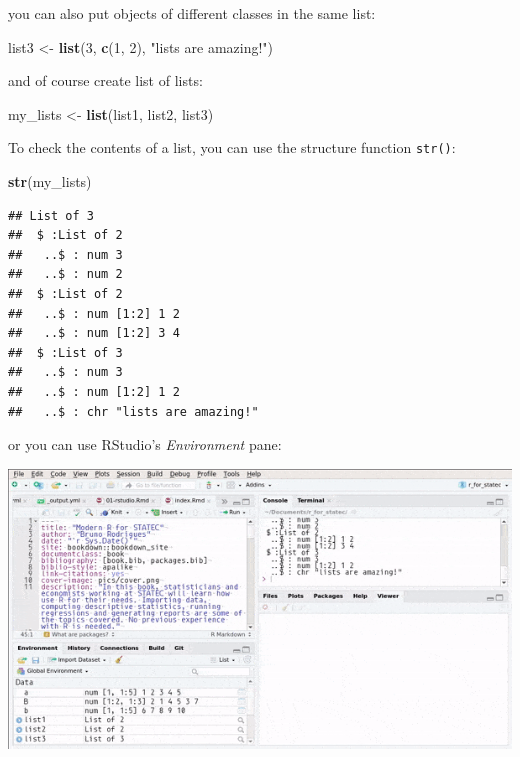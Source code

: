 \documentclass[]{gitbook}
\newenvironment{Shaded}{\begin{snugshade}}{\end{snugshade}}
\newcommand{\DecValTok}[1]{\textcolor[rgb]{0.00,0.00,0.81}{#1}}
\newcommand{\KeywordTok}[1]{\textcolor[rgb]{0.13,0.29,0.53}{\textbf{#1}}}
\newcommand{\NormalTok}[1]{#1}
\newcommand{\StringTok}[1]{\textcolor[rgb]{0.31,0.60,0.02}{#1}}
\begin{document}
you can also put objects of different classes in the same list:

\begin{Shaded}
\begin{Highlighting}[]
\NormalTok{list3 <-}\StringTok{ }\KeywordTok{list}\NormalTok{(}\DecValTok{3}\NormalTok{, }\KeywordTok{c}\NormalTok{(}\DecValTok{1}\NormalTok{, }\DecValTok{2}\NormalTok{), }\StringTok{"lists are amazing!"}\NormalTok{)}
\end{Highlighting}
\end{Shaded}

and of course create list of lists:

\begin{Shaded}
\begin{Highlighting}[]
\NormalTok{my_lists <-}\StringTok{ }\KeywordTok{list}\NormalTok{(list1, list2, list3)}
\end{Highlighting}
\end{Shaded}

To check the contents of a list, you can use the structure function \texttt{str()}:

\begin{Shaded}
\begin{Highlighting}[]
\KeywordTok{str}\NormalTok{(my_lists)}
\end{Highlighting}
\end{Shaded}

\begin{verbatim}
## List of 3
##  $ :List of 2
##   ..$ : num 3
##   ..$ : num 2
##  $ :List of 2
##   ..$ : num [1:2] 1 2
##   ..$ : num [1:2] 3 4
##  $ :List of 3
##   ..$ : num 3
##   ..$ : num [1:2] 1 2
##   ..$ : chr "lists are amazing!"
\end{verbatim}

or you can use RStudio's \emph{Environment} pane:

\includegraphics{pics/rstudio_environment_list.gif}
\end{document}
